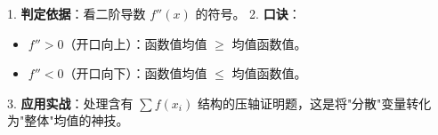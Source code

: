 \begin{summarybox}
1. \textbf{判定依据}：看二阶导数 $f''(x)$ 的符号。
2. \textbf{口诀}：
    \begin{itemize}
        \item $f'' > 0$（开口向上）：函数值均值 $\geqslant$ 均值函数值。
        \item $f'' < 0$（开口向下）：函数值均值 $\leqslant$ 均值函数值。
    \end{itemize}
3. \textbf{应用实战}：处理含有 $\sum f(x_i)$ 结构的压轴证明题，这是将"分散"变量转化为"整体"均值的神技。
\end{summarybox}